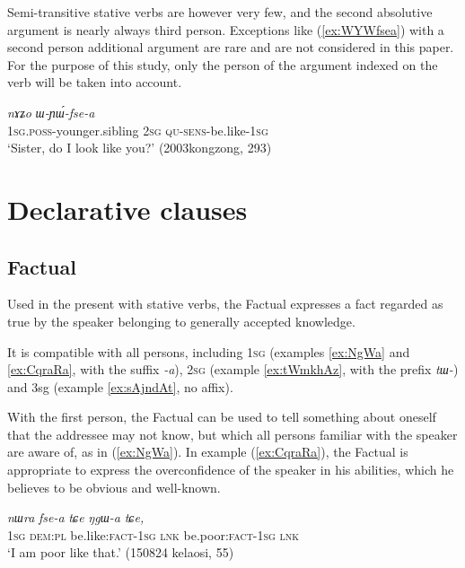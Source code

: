 \documentclass[oldfontcommands,oneside,a4paper,11pt]{article}
\newcommand{\ipa}[1]{{\phon\textit{#1}}} %
\newcommand{\refb}[1]{(\ref{#1})}
\begin{document}
Semi-transitive stative verbs are however very few, and the second absolutive argument is nearly always third person. Exceptions like \refb{ex:WYWfsea} with a second person additional argument are rare and are not considered in this paper. For the purpose of this study, only the person of the argument indexed on the verb will be taken into account.


\begin{exe}
\ex \label{ex:WYWfsea}
\gll \ipa{a-ʁi,} 	\ipa{nɤʑo} 	\ipa{ɯ-ɲɯ́-fse-a} \\
\textsc{1sg.poss}-younger.sibling \textsc{2sg} \textsc{qu-sens}-be.like-\textsc{1sg} \\
\glt `Sister, do I look like you?' (2003kongzong, 293)
\end{exe}

\section{Declarative clauses}


\subsection{Factual}

Used in the present with stative verbs, the Factual expresses a fact regarded as true by the speaker belonging to generally accepted knowledge. 

It is compatible with all persons, including \textsc{1sg} (examples \ref{ex:NgWa} and \ref{ex:CqraRa}, with the suffix \ipa{-a}), \textsc{2sg} (example \ref{ex:tWmkhAz}, with the prefix \ipa{tɯ-}) and 3sg (example \ref{ex:sAjndAt}, no affix).

With the first person, the Factual can be used to tell something about oneself that the addressee may not know, but which all persons familiar with the speaker are aware of, as in \refb{ex:NgWa}. In example \refb{ex:CqraRa}, the Factual is appropriate to express the overconfidence of the speaker in his abilities, which he believes to be obvious and well-known.

\begin{exe}
\ex \label{ex:NgWa}
\gll \ipa{aʑo} 	\ipa{nɯra} 	\ipa{fse-a} 	\ipa{tɕe} 	\ipa{ŋgɯ-a} 	\ipa{tɕe,} \\
\textsc{1sg} \textsc{dem:pl} be.like:\textsc{fact-1sg} \textsc{lnk} be.poor:\textsc{fact-1sg} \textsc{lnk} \\
\glt `I am poor like that.' (150824 kelaosi, 55)
\end{exe}
\end{document}

